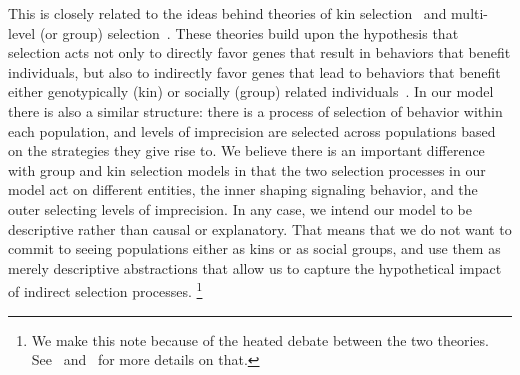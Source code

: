 \documentclass[a4paper]{article}
\begin{document}
This is closely related to the ideas behind theories of kin selection~\parencite{hamilton_genetical_1964} and multi-level (or group) selection~\parencite{wilson_theory_1975}.
These theories build upon the hypothesis that selection acts not only to directly favor genes that result in behaviors that benefit individuals, but also to indirectly favor genes that lead to behaviors that benefit either genotypically (kin) or socially (group) related individuals~\parencite[see][for more details]{okasha_evolution_2006}.
In our model there is also a similar structure: there is a process of selection of behavior within each population, and levels of imprecision are selected across populations based on the strategies they give rise to.
We believe there is an important difference with group and kin selection models in that the two selection processes in our model act on different entities, the inner shaping signaling behavior, and the outer selecting levels of imprecision.
In any case, we intend our model to be descriptive rather than causal or explanatory.
That means that we do not want to commit to seeing populations either as kins or as social groups, and use them as merely descriptive abstractions that allow us to capture the hypothetical impact of indirect selection processes.%
\footnote{We make this note because of the heated debate between the two theories. See~\textcite{kohn_darwin_2008} and~\textcite{kramer_kin_2016} for more details on that.}%
\end{document}
